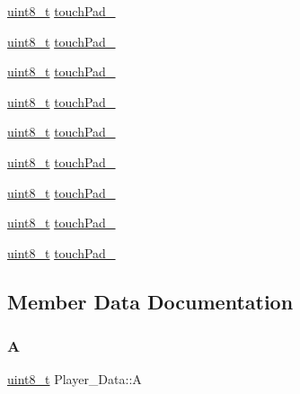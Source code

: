 \begin{DoxyCompactItemize}
\item 
\hyperlink{stdint_8h_aba7bc1797add20fe3efdf37ced1182c5}{uint8\+\_\+t} \hyperlink{structPlayer__Data_a5f3cb9e5383eb8bd7a7abe45385eb083}{touch\+Pad\+\_}
\item 
\hyperlink{stdint_8h_aba7bc1797add20fe3efdf37ced1182c5}{uint8\+\_\+t} \hyperlink{structPlayer__Data_a3e22d254876e79a0611e63f5a9cc862f}{touch\+Pad\+\_}
\item 
\hyperlink{stdint_8h_aba7bc1797add20fe3efdf37ced1182c5}{uint8\+\_\+t} \hyperlink{structPlayer__Data_aaa43994c7f24a0d5a278727f6391f336}{touch\+Pad\+\_}
\item 
\hyperlink{stdint_8h_aba7bc1797add20fe3efdf37ced1182c5}{uint8\+\_\+t} \hyperlink{structPlayer__Data_a1480707fb5bbd53367b6a8ce7201c75c}{touch\+Pad\+\_}
\item 
\hyperlink{stdint_8h_aba7bc1797add20fe3efdf37ced1182c5}{uint8\+\_\+t} \hyperlink{structPlayer__Data_a6bafb3226ae97054d002de1b7cdbe434}{touch\+Pad\+\_}
\item 
\hyperlink{stdint_8h_aba7bc1797add20fe3efdf37ced1182c5}{uint8\+\_\+t} \hyperlink{structPlayer__Data_a7746db7d866b635870b17e332180ac76}{touch\+Pad\+\_}
\item 
\hyperlink{stdint_8h_aba7bc1797add20fe3efdf37ced1182c5}{uint8\+\_\+t} \hyperlink{structPlayer__Data_a3c97af99999c0db14fde01abcd92f3ea}{touch\+Pad\+\_}
\item 
\hyperlink{stdint_8h_aba7bc1797add20fe3efdf37ced1182c5}{uint8\+\_\+t} \hyperlink{structPlayer__Data_ad38d0230e089e81b70e51d5213386cc3}{touch\+Pad\+\_}
\item 
\hyperlink{stdint_8h_aba7bc1797add20fe3efdf37ced1182c5}{uint8\+\_\+t} \hyperlink{structPlayer__Data_af1e9b9f5ff52e3b27feaca0acf184940}{touch\+Pad\+\_}
\end{DoxyCompactItemize}


\subsection{Member Data Documentation}
\mbox{\label{structPlayer__Data_a7a048f31e296b223a1d85bc2b17acabd}} 
\subsubsection{\texorpdfstring{A}{A}}
{\footnotesize\ttfamily \hyperlink{stdint_8h_aba7bc1797add20fe3efdf37ced1182c5}{uint8\+\_\+t} Player\+\_\+\+Data\+::A}

